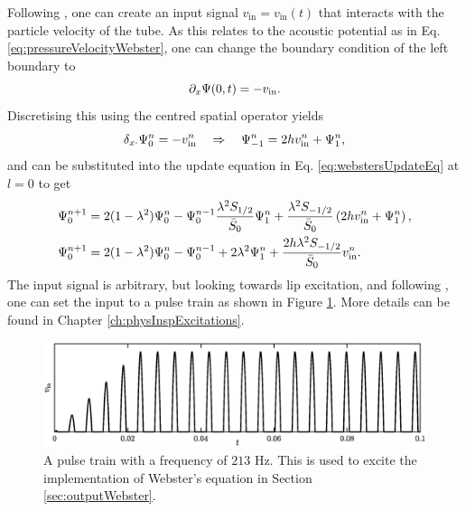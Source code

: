 Following \cite{Bilbao2018}, one can create an input signal $v_\text{in} = v_\text{in}(t)$ that interacts with the particle velocity of the tube. As this relates to the acoustic potential as in Eq. \eqref{eq:pressureVelocityWebster}, one can change the boundary condition of the left boundary to
\begin{equation}
    \partial_x \Psi(0, t) = - v_\text{in}.
\end{equation}
Discretising this using the centred spatial operator yields
\begin{equation}
    \delta_{x\cdot} \Psi_0^n = -v_\text{in}^n \quad \Rightarrow \quad \Psi_{-1}^n = 2h v_\text{in}^n + \Psi_1^n,
\end{equation}
and can be substituted into the update equation in Eq. \eqref{eq:webstersUpdateEq} at $l=0$ to get
\begin{align}
    \Psi_0^{n+1} &= 2(1-\lambda^2)\Psi_0^n-\Psi_0^{n-1} \frac{\lambda^2S_{1/2}}{\bar{S}_0}\Psi_1^n + \frac{\lambda^2S_{-1/2}}{\bar{S}_0}\left(2h v_\text{in}^n + \Psi_1^n\right),\nonumber\\
    \Psi_0^{n+1} &= 2(1-\lambda^2)\Psi_0^n-\Psi_0^{n-1} +2\lambda^2\Psi_1^n + \frac{2h\lambda^2S_{-1/2}}{\bar{S}_0} v_\text{in}^n.
\end{align}
The input signal is arbitrary, but looking towards lip excitation, and following \cite{theBible}, one can set the input to a pulse train as shown in Figure \ref{fig:inputWebster}. More details can be found in Chapter \ref{ch:physInspExcitations}.
\begin{figure}[h]
    \centering
    \includegraphics[width=\textwidth]{figures/resonators/brass/inputWebster.eps}
    \caption{A pulse train with a frequency of $213$ Hz. This is used to excite the implementation of Webster's equation in Section \ref{sec:outputWebster}. \label{fig:inputWebster}}
\end{figure}




